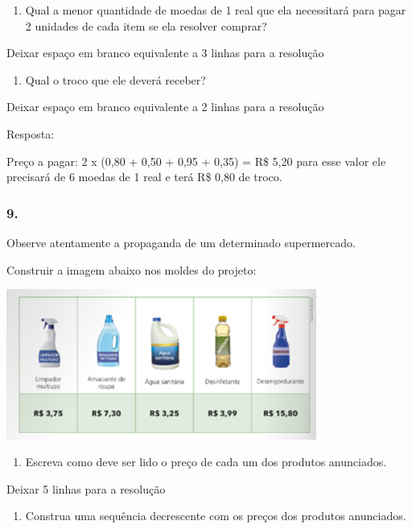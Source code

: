 \begin{enumerate}
\def\labelenumi{\alph{enumi})}
\item
  Qual a menor quantidade de moedas de 1 real que ela necessitará para
  pagar 2 unidades de cada item se ela resolver comprar?
\end{enumerate}

Deixar espaço em branco equivalente a 3 linhas para a resolução

\begin{enumerate}
\def\labelenumi{\alph{enumi})}
\item
  Qual o troco que ele deverá receber?
\end{enumerate}

Deixar espaço em branco equivalente a 2 linhas para a resolução

Resposta:

Preço a pagar: 2 x (0,80 + 0,50 + 0,95 + 0,35) = R\$ 5,20 para esse
valor ele precisará de 6 moedas de 1 real e terá R\$ 0,80 de troco.

\subsubsection{9.}\label{section-73}

Observe atentamente a propaganda de um determinado supermercado.

Construir a imagem abaixo nos moldes do projeto:

\includegraphics[width=4.00868in,height=1.94184in]{media/image87.png}

\begin{enumerate}
\def\labelenumi{\alph{enumi})}
\item
  Escreva como deve ser lido o preço de cada um dos produtos anunciados.
\end{enumerate}

Deixar 5 linhas para a resolução

\begin{enumerate}
\def\labelenumi{\alph{enumi})}
\item
  Construa uma sequência decrescente com os preços dos produtos
  anunciados.
\end{enumerate}

